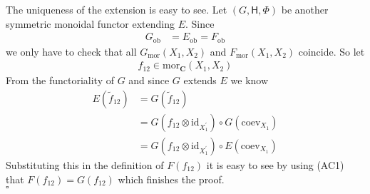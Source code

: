 \begin{prf}[Sketch]
The uniqueness of the extension is easy to see. Let $(G,\mathsf{H},\Phi)$ be another symmetric monoidal functor extending $E$. Since
\begin{align*}
  G_{\mathrm{ob}}
  &=
  E_{\mathrm{ob}}
  =
  F_{\mathrm{ob}}
\end{align*}
we only have to check that all $G_{\mathrm{mor}}(X_{1},X_{2})$ and $F_{\mathrm{mor}}(X_{1},X_{2})$ coincide. So let
\begin{align*}
  f_{12}
  \in
  \mathrm{mor}_{\mathbf{C}}(X_{1},X_{2})
\end{align*}
From the functoriality of $G$ and since $G$ extends $E$ we know
\begin{align*}
  E(\tilde{f}_{12})
  &=
  G(\tilde{f}_{12})
  \\
  &=
  G
  \left(
    f_{12}
    \otimes
    \mathrm{id}_{X_{1}^{\prime}}
  \right)
  \circ
  G(\mathrm{coev}_{X_{1}})
  \\
  &=
  G
  \left(
    f_{12}
    \otimes
    \mathrm{id}_{X_{1}^{\prime}}
  \right)
  \circ
  E(\mathrm{coev}_{X_{1}})
\end{align*}
Substituting this in the definition of $F(f_{12})$ it is easy to see by using (AC1) that $F(f_{12}) = G(f_{12})$ which finishes the proof.
\\
\phantom{proven}
\hfill
$\square$
\end{prf}
